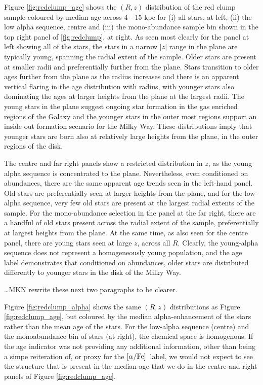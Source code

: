 \documentclass[12pt, preprint]{aastex}
\newcommand{\alphafe}{\mbox{$\rm [\alpha/Fe]$}}
\begin{document}
Figure \ref{fig:redclump_age} shows the $(R,z)$ distribution of the red clump sample coloured by median age across 4 - 15 kpc for  (i) all stars, at left, (ii) the low alpha sequence, centre and (iii) the mono-abundance sample bin shown in the top right panel of \ref{fig:redclump}, at right. As seen most clearly for the panel at left showing all of the stars, the stars in a narrow $|z|$ range in the plane are typically young, spanning the radial extent of the sample. Older stars are present at smaller radii and preferentially further from the plane. Stars transition to older ages further from the plane as the radius increases and there is an apparent vertical flaring in the age distribution with radius, with younger stars also dominating the ages at larger heights from the plane at the largest radii. The young stars in the plane suggest ongoing star formation in the gas enriched regions of the Galaxy and the younger stars in the outer most regions support  an inside out formation scenario for the Milky Way. These distributions imply that younger stars are born also at relatively large heights from the plane, in the outer regions of the disk. 

The centre and far right panels show a restricted distribution in  $z$, as the young alpha sequence is concentrated to the plane. Nevertheless, even conditioned on abundances, there are the same apparent age trends seen in the left-hand panel. Old stars are preferentially seen at larger heights from the plane, and for the low-alpha sequence, very few old stars are present at the largest radial extents of the sample. For the mono-abundance selection in the panel at the far right, there are a handful of old stars present across the radial extent of the sample, preferentially at largest heights from the plane. At the same time, as also seen for the centre panel, there are young stars seen at large $z$, across all $R$. Clearly, the young-alpha sequence does not represent a homogeneously young population, and the age label demonstrates that conditioned on abundances, older stars are distributed differently to younger stars in the disk of the Milky Way. 

\ldots MKN rewrite these next two paragraphs to be clearer.

Figure \ref{fig:redclump_alpha} shows the same $(R,z)$ distributions as Figure \ref{fig:redclump_age}, but coloured by the median alpha-enhancement of the stars rather than the mean age of the stars. For the low-alpha sequence (centre) and the monoabundance bin of stars (at right), the chemical space is homogenous. If the age indicator was not providing any additional information, other than being a simpe reiteration of, or proxy for the \alphafe\ label, we would not expect to see the structure that is present in the median age that we do in the centre and right panels of Figure \ref{fig:redclump_age}. 
\end{document}
